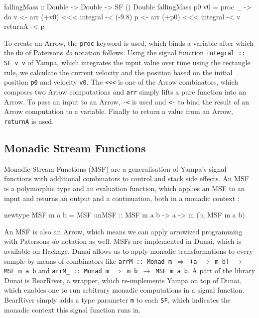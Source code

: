 \begin{HaskellCode}
fallingMass :: Double -> Double -> SF () Double
fallingMass p0 v0 = proc _ -> do
  v <- arr (+v0) <<< integral -< (-9.8)
  p <- arr (+p0) <<< integral -< v
  returnA -< p
\end{HaskellCode}

To create an Arrow, the \texttt{proc} keyword is used, which binds a variable after which the \texttt{do} of Patersons \textit{do} notation \cite{paterson_new_2001} follows. Using the signal function \texttt{integral :: SF v v} of Yampa, which integrates the input value over time using the rectangle rule, we calculate the current velocity and the position based on the initial position \texttt{p0} and velocity \texttt{v0}. The \texttt{<<<} is one of the Arrow combinators, which composes two Arrow computations and \texttt{arr} simply lifts a pure function into an Arrow. To pass an input to an Arrow, \texttt{-<} is used and \texttt{<-} to bind the result of an Arrow computation to a variable. Finally to return a value from an Arrow, \texttt{returnA} is used.

\subsection{Monadic Stream Functions}
\label{sec:back_msf}
Monadic Stream Functions (MSF) are a generalisation of Yampa's signal functions with additional combinators to control and stack side effects. An MSF is a polymorphic type and an evaluation function, which applies an MSF to an input and returns an output and a continuation, both in a monadic context \cite{perez_extensible_2017,perez_functional_2016}:
\begin{HaskellCode}
newtype MSF m a b = MSF {unMSF :: MSF m a b -> a -> m (b, MSF m a b)}
\end{HaskellCode}

An MSF is also an Arrow, which means we can apply arrowized programming with Patersons \textit{do} notation as well. MSFs are implemented in Dunai, which is available on Hackage. Dunai allows us to apply monadic transformations to every sample by means of combinators like \texttt{arrM :: Monad m $\Rightarrow$ (a $\rightarrow$ m b) $\rightarrow$ MSF m a b} and \texttt{arrM\_ :: Monad m $\Rightarrow$ m b $\rightarrow$ MSF m a b}. A part of the library Dunai is BearRiver, a wrapper, which re-implements Yampa on top of Dunai, which enables one to run arbitrary monadic computations in a signal function. BearRiver simply adds a type parameter \texttt{m} to each \texttt{SF}, which indicates the monadic context this signal function runs in.

